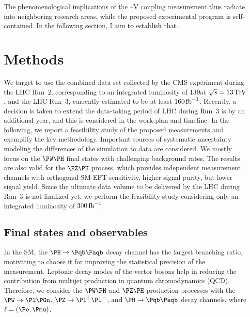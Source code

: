 \documentclass[a4paper,11pt]{article}
\newcommand{\Pb}{{{\Pqb}}\xspace}
\newcommand{\PAb}{{{{\Paqb}}}\xspace}
\renewcommand{\PV}{{{{V}}}\xspace}
\begin{document}
The phenomenological implications of the \PH--\PV coupling measurement thus radiate into neighboring research areas, while the proposed experimental program is self-contained.
In the following section, I aim to establish that. 

\section{Methods}
\label{sec:method}

We target to use the combined data set collected by the CMS experiment during the LHC Run~2, corresponding to an integrated luminosity of 139\fbinv at $\sqrt{s}=13\,\text{Te\hspace{-.08em}V}$, and the LHC Run~3, currently estimated to be at least $160\mbox{\ensuremath{\,\text{fb}^{-1}}}$.
Recently, a decision is taken to extend the data-taking period of LHC during Run~3 is by an additional year, and this is considered in the work plan and timeline. 
In the following, we report a feasibility study of the proposed measurements and exemplify the key methodology.
Important sources of systematic uncertainty modeling the differences of the simulation to data are considered. 
We mostly focus on the $\PW\PH$ final states with challenging background rates. 
The results are also valid for the $\PZ\PH$ process, which provides independent measurement channels with orthogonal SM-EFT sensitivity, higher signal purity, but lower signal yield.
Since the ultimate data volume to be delivered by the LHC during Run~3 is not finalized yet, we perform the feasibility study considering only an integrated luminosity of $300\mbox{\ensuremath{\,\text{fb}^{-1}}}$. 

\subsection{Final states and observables}

In the SM, the $\PH\rightarrow\Pb \PAb$ decay channel has the largest branching ratio, motivating to choose it for improving  the statistical precision of the measurement.
Leptonic decay modes of the vector bosons help in reducing the contribution from multijet production in quantum chromodynamics (QCD).
Therefore, we consider the $\PW\PH$ and $\PZ\PH$ production processes with the $\PW\rightarrow\Pl\Pgn$, $\PZ\rightarrow{\Pl}^{+} {\Pl}^{-}$, and $\PH\rightarrow\Pb\PAb $ decay channels, where $\ell=(\Pe, \Pmu)$.
\end{document}
